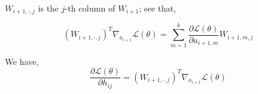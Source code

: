 \documentclass[11pt, a4paper]{article}
\begin{document}
\vspace{0.2cm}

$W_{i+1,\cdot,j}$ is the $j$-th column of $W_{i+1}$; see that,

\[
\left(W_{i+1,\cdot,j}\right)^T \nabla_{a_{i+1}} \mathscr{L}(\theta)
=
\sum_{m=1}^{k} \dfrac{\partial \mathscr{L}(\theta)}{\partial a_{i+1,m}} W_{i+1,m,j}
\]

\vspace{0.2cm}

We have,
\[
\dfrac{\partial \mathscr{L}(\theta)}{\partial h_{ij}} = \left(W_{i+1,\cdot,j}\right)^T \nabla_{a_{i+1}} \mathscr{L}(\theta)
\]

\vspace{0.2cm}

\begin{table}
\def\arraystretch{1.5}


\end{table}
\end{document}
